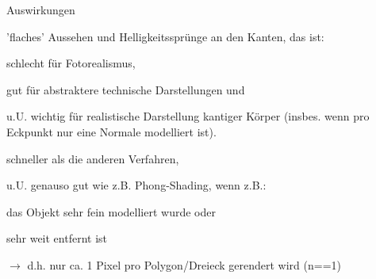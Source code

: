 \documentclass[landscape]{article}
\begin{document}
\begin{multicols}{3}
  Auswirkungen
  \begin{itemize*}
    \item 'flaches' Aussehen und Helligkeitssprünge an den Kanten, das ist:
    \item schlecht für Fotorealismus,
    \item gut für abstraktere technische Darstellungen und
    \item u.U. wichtig für realistische Darstellung kantiger Körper (insbes. wenn pro Eckpunkt nur eine Normale modelliert ist).
    \item schneller als die anderen Verfahren,
    \item u.U. genauso gut wie z.B. Phong-Shading, wenn z.B.:
    \item das Objekt sehr fein modelliert wurde oder
    \item sehr weit entfernt ist
    \item $\rightarrow$ d.h. nur ca. 1 Pixel pro Polygon/Dreieck gerendert wird (n==1)
  \end{itemize*}
  

\end{multicols}
\end{document}
